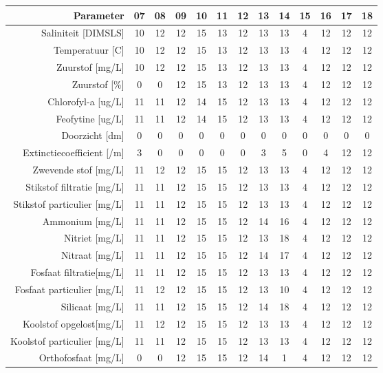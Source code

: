 \begin{tabular}{ r |c | c | c | c | c |c | c | c | c | c | c | c } 
\rowcolor[HTML]{EFEFEF}  
 Parameter & 07 & 08 & 09 & 10 & 11 & 12 & 13 & 14 & 15 & 16 & 17 & 18 \\    \hline     
Saliniteit [DIMSLS] &10 & 12 & 12 & 15 & 13 & 12 & 13 & 13 & 4 & 12 & 12 & 12 \\
Temperatuur [C] &10 & 12 & 12 & 15 & 13 & 12 & 13 & 13 & 4 & 12 & 12 & 12 \\
Zuurstof [mg/L] &10 & 12 & 12 & 15 & 13 & 12 & 13 & 13 & 4 & 12 & 12 & 12 \\
Zuurstof [\%] &0 & 0 & 12 & 15 & 13 & 12 & 13 & 13 & 4 & 12 & 12 & 12 \\
Chlorofyl-a [ug/L] &11 & 11 & 12 & 14 & 15 & 12 & 13 & 13 & 4 & 12 & 12 & 12 \\
Feofytine [ug/L] &11 & 11 & 12 & 14 & 15 & 12 & 13 & 13 & 4 & 12 & 12 & 12 \\
Doorzicht [dm] &0 & 0 & 0 & 0 & 0 & 0 & 0 & 0 & 0 & 0 & 0 & 0 \\
Extinctiecoefficient [/m] &3 & 0 & 0 & 0 & 0 & 0 & 3 & 5 & 0 & 4 & 12 & 12 \\
Zwevende stof [mg/L] &11 & 12 & 12 & 15 & 15 & 12 & 13 & 13 & 4 & 12 & 12 & 12 \\
Stikstof filtratie [mg/L] &11 & 11 & 12 & 15 & 15 & 12 & 13 & 13 & 4 & 12 & 12 & 12 \\
Stikstof particulier [mg/L] &11 & 11 & 12 & 15 & 15 & 12 & 13 & 13 & 4 & 12 & 12 & 12 \\
Ammonium [mg/L] &11 & 11 & 12 & 15 & 15 & 12 & 14 & 16 & 4 & 12 & 12 & 12 \\
Nitriet [mg/L] &11 & 11 & 12 & 15 & 15 & 12 & 13 & 18 & 4 & 12 & 12 & 12 \\
Nitraat [mg/L] &11 & 11 & 12 & 15 & 15 & 12 & 14 & 17 & 4 & 12 & 12 & 12 \\
Fosfaat filtratie[mg/L] &11 & 11 & 12 & 15 & 15 & 12 & 13 & 13 & 4 & 12 & 12 & 12 \\
Fosfaat particulier [mg/L] &11 & 12 & 12 & 15 & 15 & 12 & 13 & 10 & 4 & 12 & 12 & 12 \\
Silicaat [mg/L] &11 & 11 & 12 & 15 & 15 & 12 & 14 & 18 & 4 & 12 & 12 & 12 \\
Koolstof opgelost[mg/L] &11 & 12 & 12 & 15 & 15 & 12 & 13 & 13 & 4 & 12 & 12 & 12 \\
Koolstof particulier [mg/L] &11 & 11 & 12 & 15 & 15 & 12 & 13 & 13 & 4 & 12 & 12 & 12 \\
Orthofosfaat [mg/L] &0 & 0 & 12 & 15 & 15 & 12 & 14 & 1 & 4 & 12 & 12 & 12 \\

\end{tabular}
